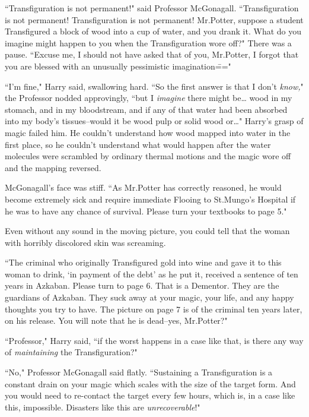 
``Transfiguration is not permanent!" said Professor McGonagall. ``Transfiguration is not permanent! Transfiguration is not permanent! Mr.\?Potter, suppose a student Transfigured a block of wood into a cup of water, and you drank it. What do you imagine might happen to you when the Transfiguration wore off?" There was a pause. ``Excuse me, I should not have asked that of you, Mr.\?Potter, I forgot that you are blessed with an unusually pessimistic imagination\==="

``I'm fine," Harry said, swallowing hard. ``So the first answer is that I don't \emph{know,}" the Professor nodded approvingly, ``but I \emph{imagine} there might be{\ldots} wood in my stomach, and in my bloodstream, and if any of that water had been absorbed into my body's tissues\---would it be wood pulp or solid wood or{\ldots}" Harry's grasp of magic failed him. He couldn't understand how wood mapped into water in the first place, so he couldn't understand what would happen after the water molecules were scrambled by ordinary thermal motions and the magic wore off and the mapping reversed.

McGonagall's face was stiff. ``As Mr.\?Potter has correctly reasoned, he would become extremely sick and require immediate Flooing to St.\?Mungo's Hospital if he was to have any chance of survival. Please turn your textbooks to page 5."

Even without any sound in the moving picture, you could tell that the woman with horribly discolored skin was screaming.

``The criminal who originally Transfigured gold into wine and gave it to this woman to drink, `in payment of the debt' as he put it, received a sentence of ten years in Azkaban. Please turn to page 6. That is a Dementor. They are the guardians of Azkaban. They suck away at your magic, your life, and any happy thoughts you try to have. The picture on page 7 is of the criminal ten years later, on his release. You will note that he is dead\---yes, Mr.\?Potter?"

``Professor," Harry said, ``if the worst happens in a case like that, is there any way of \emph{maintaining} the Transfiguration?"

``No," Professor McGonagall said flatly. ``Sustaining a Transfiguration is a constant drain on your magic which scales with the size of the target form. And you would need to re-contact the target every few hours, which is, in a case like this, impossible. Disasters like this are \emph{unrecoverable}!"

